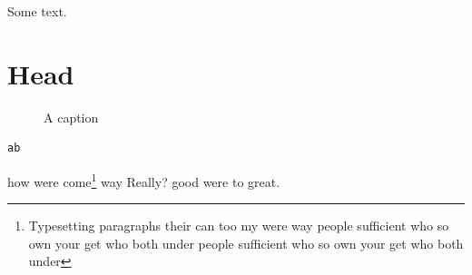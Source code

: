 \documentclass{article}
\begin{document}
Some text.
\section{Head}
\begin{figure}[t]\centering\caption{A caption}\end{figure}

\begin{lstlisting}
ab
\end{lstlisting}
how were come\footnote{Typesetting paragraphs their can too my were way people sufficient who so own your get who both under people sufficient who so own your get who both under} way Really? good were to great.
\end{document}
